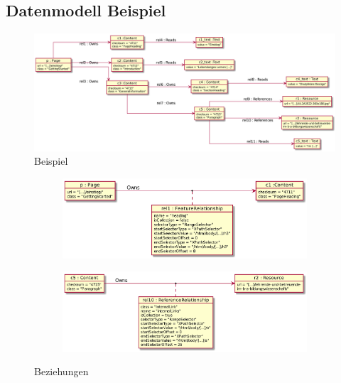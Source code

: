     \subsection{Datenmodell Beispiel}
        \begin{figure}
            \centering
            \includegraphics[width=\textwidth]{../resources/db-data-model/example/example.png}
            \caption{Beispiel}
            \label{image:dbDataModelExampleOverview}
        \end{figure}

        \begin{figure}
            \centering
            \begin{subfigure}{\textwidth}
                \includegraphics[width=\textwidth]{../resources/db-data-model/example/p-c1.png}
            \end{subfigure}

            \begin{subfigure}{\textwidth}
                \includegraphics[width=\textwidth]{../resources/db-data-model/example/c5-r2.png}
            \end{subfigure}
            \caption{Beziehungen}
            \label{image:dbDataModelExampleRelationships}
        \end{figure}

